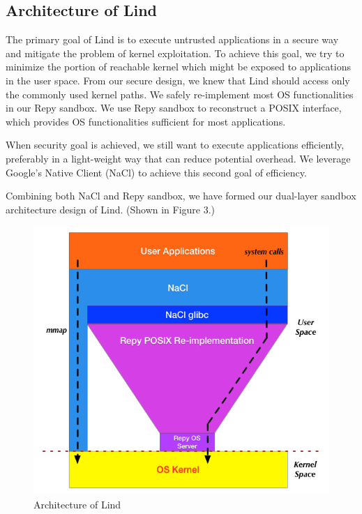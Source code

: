 \subsection{Architecture of Lind}
The primary goal of Lind is to execute untrusted applications in a secure way and mitigate the problem of kernel exploitation. 
To achieve this goal, we try to minimize the portion of reachable kernel which might be exposed to 
applications in the user space. From our secure design, we knew that Lind should access only the commonly 
used kernel paths. We safely re-implement most OS functionalities in our Repy sandbox. 
We use Repy sandbox to reconstruct a POSIX interface, which provides OS functionalities sufficient for most applications. 
   
When security goal is achieved, we still want to execute applications efficiently, preferably in a light-weight 
way that can reduce potential overhead. We leverage Google's Native Client (NaCl) to achieve
this second goal of efficiency.  

Combining both NaCl and Repy sandbox, we have formed our dual-layer sandbox architecture 
design of Lind. (Shown in Figure 3.)  

\begin{figure}[h]
\centering
\includegraphics[width=1.0\columnwidth]{diagram/lind_architecture.png}
\caption{Architecture of Lind}
\label{fig:architecture}
\end{figure}

